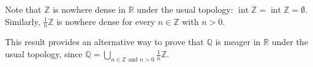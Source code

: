 \documentclass[12pt]{article}
\begin{document}
Note that $\mathbb{Z}$ is nowhere dense in $\mathbb{R}$ under the usual topology:  $\operatorname{int} \overline{\mathbb{Z}}=\operatorname{int} \mathbb{Z}=\emptyset$.  Similarly, $\frac{1}{n} \mathbb{Z}$ is nowhere dense for every $n \in \mathbb{Z}$ with $n>0$.

This result provides an alternative way to prove that $\mathbb{Q}$ is meager in $\mathbb{R}$ under the usual topology, since $\displaystyle \mathbb{Q}=\bigcup_{n \in \mathbb{Z} \text{ and } n>0} \textstyle{\frac{1}{n}} \mathbb{Z}$.
\end{document}
